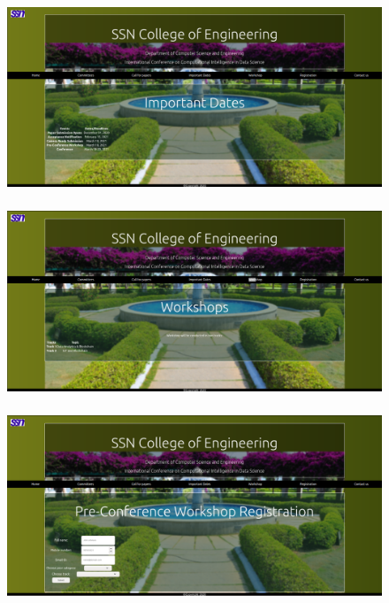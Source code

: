 \documentclass[12pt,letterpaper]{article}
\begin{document}
\newpage
\subsubsection*{}
\begin{figure}[h]
    \centering
    \includegraphics[width = \textwidth]{Pics/dates.png}
\end{figure}

\newpage
\subsubsection*{}
\begin{figure}[h]
    \centering
    \includegraphics[width = \textwidth]{Pics/workshop.png}
\end{figure}

\newpage
\subsubsection*{}
\begin{figure}[h]
    \centering
    \includegraphics[width = \textwidth]{Pics/registration.png}
\end{figure}
\end{document}

